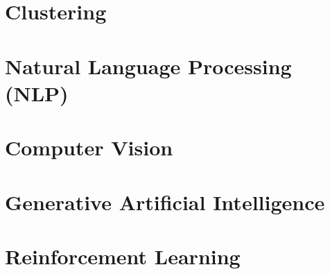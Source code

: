 \documentclass[a4paper]{book}
\begin{document}
\chapter{Clustering}
\label{ch:clustering}
\framedtext{\color{red}{TODO:}}



\chapter{Natural Language Processing (NLP)}
\label{ch:nlp}
\framedtext{\color{red}{TODO:}}
\chapter{Computer Vision}
\label{ch:computer-vision}
\framedtext{\color{red}{TODO:}}
\chapter{Generative Artificial Intelligence}
\label{ch:generative-ai}
\framedtext{\color{red}{TODO:}}
\chapter{Reinforcement Learning}
\label{ch:reinforcement-learning}
\framedtext{\color{red}{TODO:}}

\newpage
{
  \setcounter{page}{1}
  

  
  
}
\end{document}
